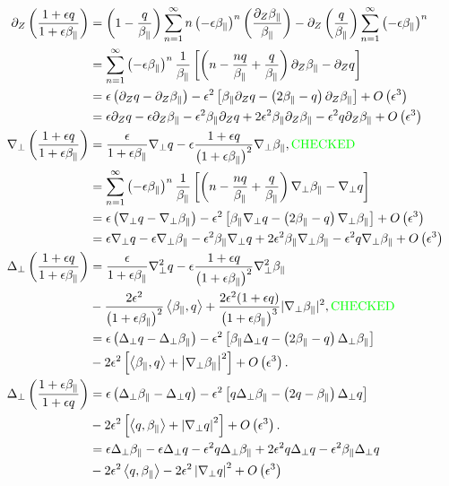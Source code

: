 \documentclass{article}
\newcommand{\para}{\parallel}
\newcommand{\ep}{\epsilon}
\newcommand{\np}{\nabla_\perp}
\newcommand{\lap}{\Delta_\perp}
\newcommand{\p}{\partial}
\newcommand{\fr}{\frac{1+\ep q}{1+\ep\beta_\para}}
\newcommand{\frinv}{\frac{1+\ep\beta_\para}{1+\ep q}}
\newcommand{\pth} [1] {\left( #1 \right) }
\newcommand{\br} [1] {\left[ #1 \right] }
\begin{document}
\begin{align}
    \p_Z\pth{\fr} &= \pth{1-\frac{q}{\beta_\para}} \sum^\infty_{n=1} n\pth{-\ep\beta_\para}^n \pth{\frac{\p_Z\beta_\para}{\beta_\para}} - \p_Z\pth{\frac{q}{\beta_\para}} \sum^\infty_{n=1} \pth{-\ep\beta_\para}^n \\ 
        &= \sum^\infty_{n=1} \pth{-\ep\beta_\para}^n \frac{1}{\beta_\para} \br{\pth{n - \frac{nq}{\beta_\para} + \frac{q}{\beta_\para}} \p_Z\beta_\para - \p_Z q } \\ 
        &= \ep\pth{\p_Z q-\p_Z\beta_\para} - \ep^2 \br{\beta_\para\p_Z q - \pth{2\beta_\para-q} \p_Z\beta_\para} + O\pth{\ep^3} \\ 
        &= \ep\p_Z q - \ep\p_Z\beta_\para - \ep^2\beta_\para\p_Z q + 2\ep^2\beta_\para\p_Z\beta_\para - \ep^2q\p_Z\beta_\para + O\pth{\ep^3} \\ 
    \np \pth{\fr} &= \frac{\ep}{1+\ep\beta_\para}\np q - \ep\frac{1+\ep q}{\pth{1+\ep\beta_\para}^2} \np\beta_\para, \text{\color{green} CHECKED} \\ 
        &= \sum^\infty_{n=1} \pth{-\ep\beta_\para}^n \frac{1}{\beta_\para} \br{\pth{n - \frac{nq}{\beta_\para} + \frac{q}{\beta_\para}} \np\beta_\para - \np q } \\ 
        &= \ep\pth{\np q-\np\beta_\para} - \ep^2 \br{\beta_\para\np q - \pth{2\beta_\para-q} \np\beta_\para} + O\pth{\ep^3} \\ 
        &= \ep\np q - \ep\np\beta_\para - \ep^2\beta_\para\np q + 2\ep^2\beta_\para\np\beta_\para - \ep^2q\np\beta_\para + O\pth{\ep^3} \\ 
    \lap \pth{\fr} &= \frac{\ep}{1+\ep\beta_\para}\np^2 q - \ep\frac{1+\ep q}{\pth{1+\ep\beta_\para}^2} \np^2 \beta_\para \\ 
        &- \frac{2\ep^2}{\pth{1+\ep\beta_\para}^2} \Braket{\beta_\para,q} + \frac{2\ep^2 (1+\ep q)}{\pth{1+\ep\beta_\para}^3} |\np\beta_\para|^2, \text{\color{green} CHECKED} \\ 
        &= \ep\pth{\lap q-\lap\beta_\para} - \ep^2 \br{\beta_\para\lap q - \pth{2\beta_\para-q} \lap\beta_\para} \\ 
        &- 2\ep^2 \br{\Braket{\beta_\para, q} + \left|\np\beta_\para\right|^2} + O\pth{\ep^3}. \\  
    \lap\pth{\frinv} &= \ep\pth{\lap \beta_\para-\lap q} - \ep^2 \br{q\lap \beta_\para - \pth{2q-\beta_\para} \lap q} \\ 
    &- 2\ep^2 \br{\Braket{q, \beta_\para} + \left|\np q\right|^2} + O\pth{\ep^3}. \\ 
        &= \ep\lap\beta_\para - \ep\lap q - \ep^2q\lap \beta_\para + 2\ep^2q\lap q - \ep^2\beta_\para\lap q \\ 
        &- 2\ep^2\Braket{q, \beta_\para} - 2\ep^2\left|\np q\right|^2 + O\pth{\ep^3} 
\end{align} 
\end{document}
